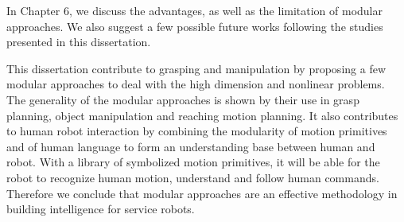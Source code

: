 In Chapter 6, we discuss the advantages, as well as the limitation of modular approaches. We also suggest a few possible future works following the studies presented in this dissertation.

This dissertation contribute to grasping and manipulation by proposing a few modular approaches to deal with the high dimension and nonlinear problems. The generality of the modular approaches is shown by their use in grasp planning, object manipulation and reaching motion planning. It also contributes to human robot interaction by combining the modularity of motion primitives and of human language to form an understanding base between human and robot. With a library of symbolized motion primitives, it will be able for the robot to recognize human motion, understand and follow human commands. Therefore we conclude that modular approaches are an effective methodology in building intelligence for service robots.





